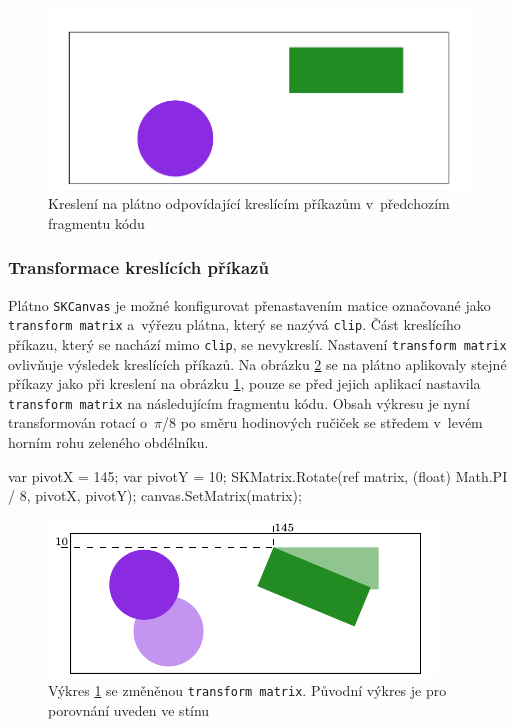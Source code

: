 \begin{figure}[!hbt]
	\includegraphics[width=\textwidth]{../img/kap3_skia_matrix_identity}
	\caption{Kreslení na plátno odpovídající kreslícím příkazům v~předchozím fragmentu kódu}
	\label{fig:skia_kresleni_ukazka}
\end{figure}

\subsubsection*{Transformace kreslících příkazů}
\label{kap3:skia_intro_transformations}
Plátno \texttt{SKCanvas} je možné konfigurovat přenastavením matice označované jako \texttt{transform matrix} a~výřezu plátna, který se nazývá \texttt{clip}. Část kreslícího příkazu, který se nachází mimo \texttt{clip}, se nevykreslí. Nastavení \texttt{transform matrix} ovlivňuje výsledek kreslících příkazů. Na obrázku \ref{fig:skia_kresleni_ukazka_transformace} se na plátno aplikovaly stejné příkazy jako při kreslení na obrázku \ref{fig:skia_kresleni_ukazka}, pouze se před jejich aplikací nastavila \texttt{transform matrix} na následujícím fragmentu kódu. Obsah výkresu je nyní transformován rotací o~$\pi$/8 po směru hodinových ručiček se středem v~levém horním rohu zeleného obdélníku.

\begin{csharpcode}
var pivotX = 145; var pivotY = 10;
SKMatrix.Rotate(ref matrix, (float) Math.PI / 8, pivotX, pivotY);
canvas.SetMatrix(matrix);
\end{csharpcode}

\begin{figure}[!hbt]
	\includegraphics[width=\textwidth]{../img/kap3_skia_matrix_translate_scale}
	\caption{Výkres \ref{fig:skia_kresleni_ukazka} se změněnou \texttt{transform matrix}. Původní výkres je pro porovnání uveden ve stínu}
	\label{fig:skia_kresleni_ukazka_transformace}
\end{figure}


